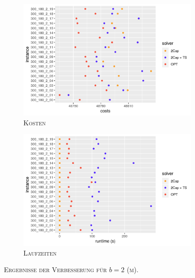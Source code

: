 \vfill
\pagebreak

\begin{figure}[H]
\centering
\begin{subfigure}[b]{0.47\textwidth}
\includegraphics[width=1.1\textwidth]{img/imp_b=2_m_costs.png}
\caption{\textsc{Kosten}}
\label{fig:imp_b=2_m_costs}
\end{subfigure}
\hfill
\begin{subfigure}[b]{0.47\textwidth}
\includegraphics[width=1.1\textwidth]{img/imp_b=2_m_runtimes.png}
\caption{\textsc{Laufzeiten}}
\label{fig:imp_b=2_m_runtimes}
\end{subfigure}
\caption{\textsc{Ergebnisse der Verbesserung für $b = 2$ (m)}.}
\label{fig:imp_res_b=2_m}
\end{figure}

